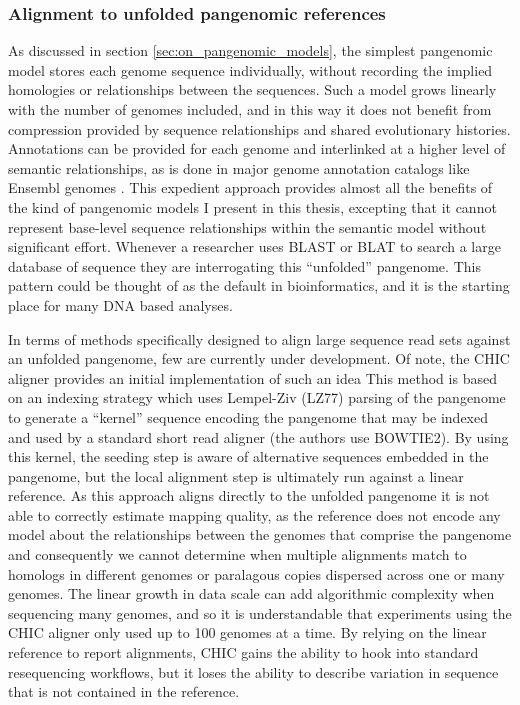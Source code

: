 \subsubsection{Alignment to unfolded pangenomic references}

As discussed in section \ref{sec:on_pangenomic_models}, the simplest pangenomic model stores each genome sequence individually, without recording the implied homologies or relationships between the sequences.
Such a model grows linearly with the number of genomes included, and in this way it does not benefit from compression provided by sequence relationships and shared evolutionary histories.
Annotations can be provided for each genome and interlinked at a higher level of semantic relationships, as is done in major genome annotation catalogs like Ensembl genomes \cite{kersey2015ensembl}.
This expedient approach provides almost all the benefits of the kind of pangenomic models I present in this thesis, excepting that it cannot represent base-level sequence relationships within the semantic model without significant effort.
Whenever a researcher uses BLAST or BLAT to search a large database of sequence they are interrogating this ``unfolded'' pangenome.
This pattern could be thought of as the default in bioinformatics, and it is the starting place for many DNA based analyses.

In terms of methods specifically designed to align large sequence read sets against an unfolded pangenome, few are currently under development.
Of note, the CHIC aligner provides an initial implementation of such an idea \cite{valenzuela2017chic}
This method is based on an indexing strategy which uses Lempel-Ziv (LZ77) \cite{ziv1977universal} parsing of the pangenome to generate a ``kernel'' sequence encoding the pangenome that may be indexed and used by a standard short read aligner (the authors use BOWTIE2).
By using this kernel, the seeding step is aware of alternative sequences embedded in the pangenome, but the local alignment step is ultimately run against a linear reference.
As this approach aligns directly to the unfolded pangenome it is not able to correctly estimate mapping quality, as the reference does not encode any model about the relationships between the genomes that comprise the pangenome and consequently we cannot determine when multiple alignments match to homologs in different genomes or paralagous copies dispersed across one or many genomes.
The linear growth in data scale can add algorithmic complexity when sequencing many genomes, and so it is understandable that experiments using the CHIC aligner only used up to 100 genomes at a time.
By relying on the linear reference to report alignments, CHIC gains the ability to hook into standard resequencing workflows, but it loses the ability to describe variation in sequence that is not contained in the reference.

